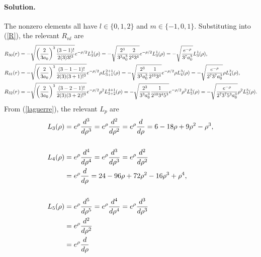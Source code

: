 \documentclass[11pt]{article}
\newcommand{\refeq}[1]{(\ref{#1})}
\newenvironment{solution}
{
    \paragraph{Solution.}
    \ignorespaces
}
{
}
\begin{document}
\begin{solution}
	The nonzero elements all have $l \in \{0, 1, 2\}$ and $m \in \{-1, 0, 1\}$.  Substituting into \refeq{R}, the relevant $R_{n l}$ are
	\begin{align*}
		R_{3 0}(r) &= -\sqrt{\left( \frac{2}{3 a_0} \right)^3 \frac{(3 - 1)!}{2 (3) 3!^3}} e^{-\rho / 2} L_{3}^{1}(\rho)
		= -\sqrt{\frac{2^3}{3^3 a_0^3} \frac{2}{2^4 3^4}} e^{-\rho / 2} L_{3}^{1}(\rho)
		= -\sqrt{\frac{e^{-\rho}}{3^7 a_0^3}} L_{3}^{1}(\rho), \\
		R_{3 1}(r) &= -\sqrt{\left( \frac{2}{3 a_0} \right)^3 \frac{(3 - 1 - 1)!}{2 (3) (3 + 1)!^3}} e^{-\rho / 2} \rho L_{3 + 1}^{2 + 1}(\rho)
		= -\sqrt{\frac{2^3}{3^3 a_0^3} \frac{1}{2^{10} 3^4}} e^{-\rho / 2} \rho L_{4}^{3}(\rho)
		= -\sqrt{\frac{e^{-\rho}}{2^7 3^7 a_0^3}} \rho L_{4}^{3}(\rho), \\
		R_{3 2}(r) &= -\sqrt{\left( \frac{2}{3 a_0} \right)^3 \frac{(3 - 2 - 1)!}{2 (3) (3 + 2)!^3}} e^{-\rho / 2} \rho^2 L_{3 + 2}^{4 + 1}(\rho)
		= -\sqrt{\frac{2^3}{3^3 a_0^3} \frac{1}{2^{10} 3^4 5^3}} e^{-\rho / 2} \rho^2 L_{5}^{5}(\rho)
		= -\sqrt{\frac{e^{-\rho}}{2^7 3^7 5^3 a_0^3}} \rho^2 L_{5}^{5}(\rho).
	\end{align*}
	From \refeq{laguerre}, the relevant $L_p$ are
	\begin{align*}
		L_3(\rho) &= e^\rho \dv[3]{}{\rho} (\rho^3 e^{-\rho})
		= e^\rho \dv[2]{}{\rho} (3 \rho^2 e^{-\rho} - \rho^3 e^{-\rho})
		= e^\rho \dv{}{\rho} (6 \rho e^{-\rho} - 6 \rho^2 e^{-\rho} + \rho^3 e^{-\rho})
		= 6 - 18 \rho + 9 \rho^2 - \rho^3, \\ \\
		L_4(\rho) &= e^\rho \dv[4]{}{\rho} (\rho^4 e^{-\rho})
		= e^\rho \dv[3]{}{\rho} (4 \rho^3 e^{-\rho} - \rho^4 e^{-\rho})
		= e^\rho \dv[2]{}{\rho} (12 \rho^2 e^{-\rho} - 8 \rho^3 e^{-\rho} + \rho^4 e^{-\rho}) \\
		&= e^\rho \dv{}{\rho} (24 \rho e^{-\rho} - 36 \rho^2 e^{-\rho} + 12 \rho^3 e^{-\rho} - \rho^4 e^{-\rho})
		= 24 - 96 \rho + 72 \rho^2 - 16 \rho^3 + \rho^4, \\ \\
		L_5(\rho) &= e^\rho \dv[5]{}{\rho} (\rho^5 e^{-\rho})
		= e^\rho \dv[4]{}{\rho} (5 \rho^4 e^{-\rho} - \rho^5 e^{-\rho})
		= e^\rho \dv[3]{}{\rho} (20 \rho^3 e^{-\rho} - 10 \rho^4 e^{-\rho} + \rho^5 e^{-\rho}) \\
		&= e^\rho \dv[2]{}{\rho} (60 \rho^2 e^{-\rho} - 60 \rho^3 e^{-\rho} + 15 \rho^4 e^{-\rho} - \rho^5 e^{-\rho}) \\
		&= e^\rho \dv{}{\rho} (120 \rho e^{-\rho} - 240 \rho^2 e^{-\rho} + 120 \rho^3 e^{-\rho} - 20 \rho^4 e^{-\rho} + \rho^5 e^{-\rho})

\end{align*}
\end{solution}
\end{document}
